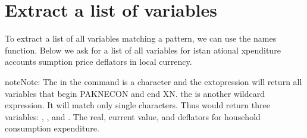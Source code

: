 \documentclass[letterpaper,10pt,english]{jupyterBook}
\begin{document}
\section{Extract a list of variables}
\label{\detokenize{content/06_WBModels/LoadingWBModel:extract-a-list-of-variables}}
\sphinxAtStartPar
To extract a list of all variables matching a pattern, we can use the names function.  Below we ask for a list of all variables for istan ational xpenditure accounts sumption  price deflators  in local currency.

\begin{sphinxadmonition}{note}{Note:}
\sphinxAtStartPar
{}
The \sphinxcode{\sphinxupquote{*}} in the command  is a  character and the extopression will return all variables that begin PAKNECON and end XN.  the  is another wildcard expression. It will match only single characters.  Thus   would return three variables: , , and .  The real, current value, and deflators for household consumption expenditure.
\end{sphinxadmonition}
\end{document}
